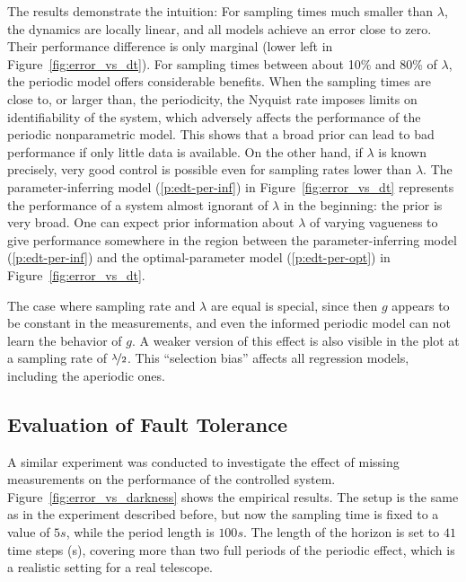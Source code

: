 The results demonstrate the intuition: For sampling times much smaller than
$\lambda$, the dynamics are locally linear, and all models achieve an error
close to zero. Their performance difference is only marginal (lower left in
Figure~\ref{fig:error_vs_dt}). For sampling times between about 10\unit{\%} and
80\unit{\%} of $\lambda$, the periodic model offers considerable benefits. When
the sampling times are close to, or larger than, the periodicity, the Nyquist
rate imposes limits on identifiability of the system, which adversely affects
the performance of the periodic nonparametric model. This shows that a broad
prior can lead to bad performance if only little data is available. On the
other hand, if $\lambda$ is known precisely, very good control is possible even
for sampling rates lower than $\lambda$. The parameter-inferring model
(\ref*{p:edt-per-inf}) in Figure~\ref{fig:error_vs_dt} represents the
performance of a system almost ignorant of $\lambda$ in the beginning: the
prior is very broad. One can expect prior information about $\lambda$ of
varying vagueness to give performance somewhere in the region between the
parameter-inferring model (\ref*{p:edt-per-inf}) and the optimal-parameter
model (\ref*{p:edt-per-opt}) in Figure~\ref{fig:error_vs_dt}.

The case where sampling rate and $\lambda$ are equal is special, since then $g$
appears to be constant in the measurements, and even the informed periodic
model can not learn the behavior of $g$. A weaker version of this effect is also
visible in the plot at a sampling rate of $\nicefrac{\lambda}{2}$. This
``selection bias'' affects all regression models, including the aperiodic ones.

\subsection{Evaluation of Fault Tolerance}
\label{sec:fault_tolerance}

A similar experiment was conducted to investigate the effect of missing
measurements on the performance of the controlled system.
Figure~\ref{fig:error_vs_darkness} shows the empirical results. The setup is the
same as in the experiment described before, but now the sampling time is fixed
to a value of $5\unit{s}$, while the period length is $100\unit{s}$. The length
of the horizon is set to $41$ time steps (\unit{s}), covering more than
two full periods of the periodic effect, which is a realistic setting for a real
telescope.

